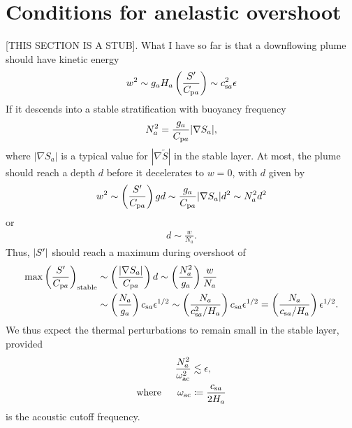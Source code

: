\documentclass[12pt]{article}
\begin{document}

\section{Conditions for anelastic overshoot}
[THIS SECTION IS A STUB]. What I have so far is that a downflowing plume should have kinetic energy 
\begin{align}
	w^2 \sim g_a H_a \left(\frac{S^\prime}{C_{{\rm p}a}}\right) \sim c_{{\rm s}a}^2 \epsilon
\end{align}
If it descends into a stable stratification with buoyancy frequency
\begin{align}
	N_a^2 =   \frac{g_a}{C_{{\rm p}a}}|\nabla S_a|,
\end{align}
where $|\nabla S_a|$ is a typical value for $|\nabla\tilde{S}|$ in the stable layer. At most, the plume should reach a depth $d$ before it decelerates to $w=0$, with $d$ given by
\begin{align}
	w^2 \sim \left(\frac{S^\prime}{C_{{\rm p}a}}\right)gd \sim \frac{g_a}{C_{{\rm p}a}}|\nabla S_a| d^2 \sim N_a^2 d^2
\end{align}
or 
\begin{align}
	d\sim \frac{w}{N_a}. 
\end{align}
Thus, $|S^\prime|$ should reach a maximum during overshoot of 
\begin{align}
	\max{\left(\frac{S^\prime}{C_{{\rm p}a}}\right)_{\rm stable}} &\sim \left(\frac{|\nabla S_a|}{C_{{\rm p}a}}\right)d \sim \left(\frac{N_a^2}{g_a}\right)\frac{w}{N_a}\nonumber\\
	&\sim \left(\frac{N_a}{g_a}\right)c_{{\rm s}a} \epsilon^{1/2}\sim \left(\frac{N_a}{c_{{\rm s}a}^2/H_a}\right)c_{{\rm s}a} \epsilon^{1/2} = \left(\frac{N_a}{c_{{\rm s}a}/H_a}\right)\epsilon^{1/2}.
\end{align}
We thus expect the thermal perturbations to remain small in the stable layer, provided 
\begin{subequations}
\begin{align}
	\frac{N_a^2}{\omega_{\rm ac}^2} &\lesssim \epsilon,\label{eq:conditionovershoot}\\
	\text{where}\ \ \ \ \  \omega_{\rm ac} &\coloneqq \frac{c_{{\rm s}a}}{2H_a}
\end{align}
\end{subequations}
is the acoustic cutoff frequency. 
\end{document}
